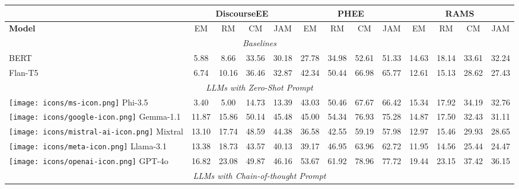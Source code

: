 \begin{table*}[h!]
\small
\centering
\renewcommand*{\arraystretch}{1}
\setlength{\tabcolsep}{5pt}
\begin{tabular}{l|cccc|cccc|cccc}
& \multicolumn{4}{c}{\textbf{DiscourseEE}} & \multicolumn{4}{c}{\textbf{PHEE}} & \multicolumn{4}{c}{\textbf{RAMS}} \\
\midrule
\textbf{Model}& EM & RM & CM & JAM & EM & RM & CM & JAM & EM & RM & CM & JAM \\
\midrule
\multicolumn{13}{c}{\textit{Baselines }}\\
\midrule
BERT & 5.88 & 8.66 & 33.56 & 30.18 & 27.78 & 34.98 & 52.61 & 51.33& 14.63 & 18.14 & 33.61 & 32.24 \\
Flan-T5 & 6.74 & 10.16 & 36.46 & 32.87 & 42.34 & 50.44 & 66.98 & 65.77 & 12.61 & 15.13 & 28.62 & 27.43\\
\midrule
\multicolumn{13}{c}{\textit{LLMs with Zero-Shot Prompt}}\\
\midrule

\texttt{[image: icons/ms-icon.png]} Phi-3.5  & 3.40 & 5.00 & 14.73 & 13.39 & 43.03 & 50.46 & 67.67 & 66.42 & 15.34 & 17.92 & 34.19 & 32.76 \\
\texttt{[image: icons/google-icon.png]} Gemma-1.1 & 11.87 & 15.86 & \cellcolor{green!50} 50.14 & \cellcolor{green!15} 45.48 & 45.00 & 54.34 & \cellcolor{green!15} 76.93 & \cellcolor{green!15} 75.28 & 14.87 & 17.50 & 32.43 & 31.11 \\
\texttt{[image: icons/mistral-ai-icon.png]} Mixtral & 13.10 & 17.74 & 48.59 & 44.38 & 36.58 & 42.55 & 59.19 & 57.98 & 12.97 & 15.46 & 29.93 & 28.65\\
\texttt{[image: icons/meta-icon.png]} Llama-3.1  & 13.38 & 18.73 & 43.57 & 40.13 & 39.17 & 46.95 & 63.96 & 62.72 & 11.95 & 14.56 & 25.44 & 24.47  \\
\texttt{[image: icons/openai-icon.png]} GPT-4o  & \cellcolor{green!50} 16.82 & \cellcolor{green!50} 23.08 & \cellcolor{green!15} 49.87 & \cellcolor{green!50} 46.16 & \cellcolor{green!50} 53.67 & \cellcolor{green!50} 61.92 & \cellcolor{green!50}78.96 &\cellcolor{green!50} 77.72 & \cellcolor{green!50}19.44 & \cellcolor{green!50} 23.15 & \cellcolor{green!50} 37.42 & \cellcolor{green!50} 36.15 \\


\midrule
\multicolumn{13}{c}{\textit{LLMs with Chain-of-thought Prompt}}\\
\midrule


\end{tabular}
\end{table*}
